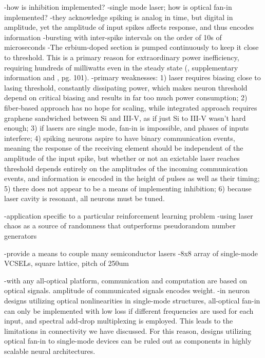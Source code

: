 -how is inhibition implemented?
-single mode laser; how is optical fan-in implemented?
-they acknowledge spiking is analog in time, but digital in amplitude, yet the amplitude of input spikes affects response, and thus encodes information
-bursting with inter-spike intervals on the order of 10s of microseconds
-The erbium-doped section is pumped continuously to keep it close to threshold. This is a primary reason for extraordinary power inefficiency, requiring hundreds of milliwatts even in the steady state (\cite{shna2016}, supplementary information and \cite{prsh2017}, pg. 101).
-primary weaknesses: 1) laser requires biasing close to lasing threshold, constantly dissipating power, which makes neuron threshold depend on critical biasing and results in far too much power consumption; 2) fiber-based approach has no hope for scaling, while integrated approach requires graphene sandwiched between Si and III-V, as if just Si to III-V wasn't hard enough; 3) if lasers are single mode, fan-in is impossible, and phases of inputs interfere; 4) spiking neurons aspire to have binary communication events, meaning the response of the receiving element should be independent of the amplitude of the input spike, but whether or not an exictable laser reaches threshold depends entirely on the amplitudes of the incoming communication events, and information is encoded in the height of pulses as well as their timing; 5) there does not appear to be a means of implementing inhibition; 6) because laser cavity is resonant, all neurons must be tuned.

\cite{nate2017}
-application specific to a particular reinforcement learning problem
-using laser chaos as a source of randomness that outperforms pseudorandom number generators

\cite{huja2015}

\cite{brfi2015}
-provide a means to couple many semiconductor lasers
-8x8 array of single-mode VCSELs, square lattice, pitch of 250um

-with any all-optical platform, communication and computation are based on optical signals. amplitude of communicated signals encodes weight.
-in neuron designs utilizing optical nonlinearities in single-mode structures, all-optical fan-in can only be implemented with low loss if different frequencies are used for each input, and spectral add-drop multiplexing is employed. This leads to the limitations in connectivity we have discussed. For this reason, designs utilizing optical fan-in to single-mode devices can be ruled out as components in highly scalable neural architectures.

